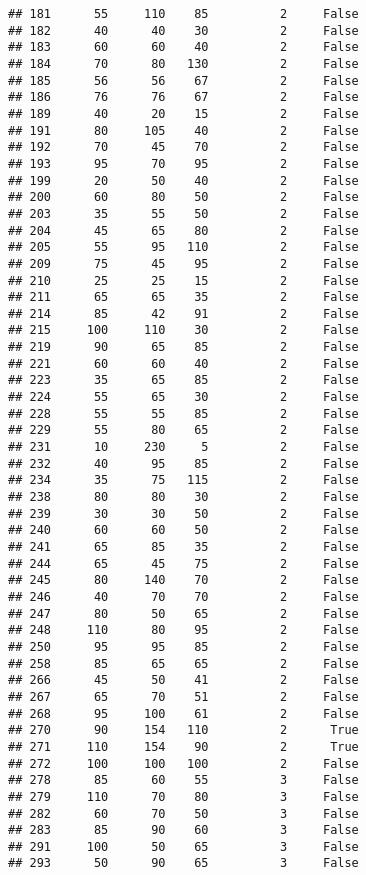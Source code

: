 \documentclass[
]{article}
\begin{document}
\begin{verbatim}
## 181      55     110    85          2     False
## 182      40      40    30          2     False
## 183      60      60    40          2     False
## 184      70      80   130          2     False
## 185      56      56    67          2     False
## 186      76      76    67          2     False
## 189      40      20    15          2     False
## 191      80     105    40          2     False
## 192      70      45    70          2     False
## 193      95      70    95          2     False
## 199      20      50    40          2     False
## 200      60      80    50          2     False
## 203      35      55    50          2     False
## 204      45      65    80          2     False
## 205      55      95   110          2     False
## 209      75      45    95          2     False
## 210      25      25    15          2     False
## 211      65      65    35          2     False
## 214      85      42    91          2     False
## 215     100     110    30          2     False
## 219      90      65    85          2     False
## 221      60      60    40          2     False
## 223      35      65    85          2     False
## 224      55      65    30          2     False
## 228      55      55    85          2     False
## 229      55      80    65          2     False
## 231      10     230     5          2     False
## 232      40      95    85          2     False
## 234      35      75   115          2     False
## 238      80      80    30          2     False
## 239      30      30    50          2     False
## 240      60      60    50          2     False
## 241      65      85    35          2     False
## 244      65      45    75          2     False
## 245      80     140    70          2     False
## 246      40      70    70          2     False
## 247      80      50    65          2     False
## 248     110      80    95          2     False
## 250      95      95    85          2     False
## 258      85      65    65          2     False
## 266      45      50    41          2     False
## 267      65      70    51          2     False
## 268      95     100    61          2     False
## 270      90     154   110          2      True
## 271     110     154    90          2      True
## 272     100     100   100          2     False
## 278      85      60    55          3     False
## 279     110      70    80          3     False
## 282      60      70    50          3     False
## 283      85      90    60          3     False
## 291     100      50    65          3     False
## 293      50      90    65          3     False

\end{verbatim}
\end{document}
